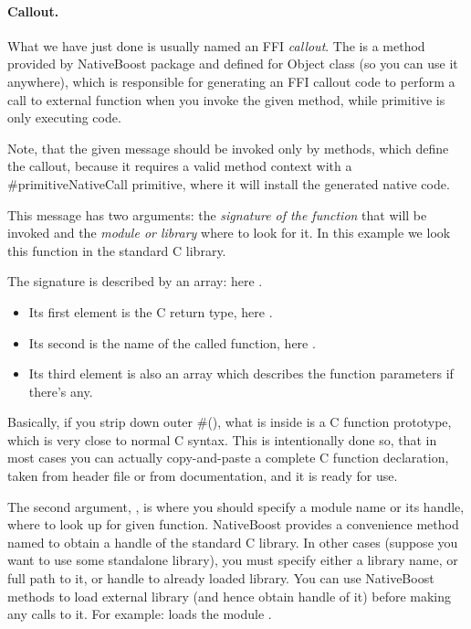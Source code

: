 \documentclass[a4paper,10pt,twoside]{book}
\begin{document}
\paragraph{Callout.}
What we have just done is usually named an FFI \emph{callout}. 
The  is a method provided by NativeBoost package and defined for Object class (so you can use it anywhere), which is responsible for
generating an FFI callout code to perform a call to external function when you invoke the given method, while primitive is only executing code.

Note, that the given message  should be invoked only by methods, which define the callout, because it requires a valid method context with a
\#primitiveNativeCall primitive, where it will install the generated native code.

This message has two arguments: the \emph{signature of the function} that will be invoked and the \emph{module or library} where to look for it.  In this example we look this function in the standard C library. 


The signature is described by an array: here .
\begin{itemize} 
\item Its first element is the C return type, here .
\item Its second is the name of the called function, here .
\item Its third element is also an array which describes the function parameters if there's any. 
\end{itemize}

Basically, if you strip down outer \#(), what is inside is a C function prototype, which is very close to normal C syntax. This is intentionally done so,
that in most cases you can actually copy-and-paste a complete C function declaration, taken from header file or from documentation, and it is ready for use.

The second argument, , is where you should specify a module name or its handle, where to look up for given function.
NativeBoost provides a convenience method named 
to obtain a handle of the standard C library. In other cases (suppose you want to use some standalone library), you must specify either a library name, or full path to it, or handle to already loaded library. You can use
NativeBoost methods  to load external library (and hence obtain handle of it) before making any calls to it. For example:  loads the module .
\end{document}
